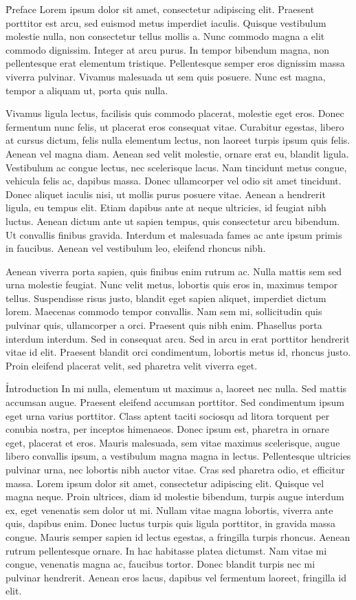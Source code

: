 \documentclass[12pt,onecolumn]{novel}
\begin{document}
\frontpage

\H{Preface}
Lorem ipsum dolor sit amet, consectetur adipiscing elit. Praesent porttitor est arcu, sed euismod metus imperdiet iaculis. Quisque vestibulum molestie nulla, non consectetur tellus mollis a. Nunc commodo magna a elit commodo dignissim. Integer at arcu purus. In tempor bibendum magna, non pellentesque erat elementum tristique. Pellentesque semper eros dignissim massa viverra pulvinar. Vivamus malesuada ut sem quis posuere. Nunc est magna, tempor a aliquam ut, porta quis nulla.

Vivamus ligula lectus, facilisis quis commodo placerat, molestie eget eros. Donec fermentum nunc felis, ut placerat eros consequat vitae. Curabitur egestas, libero at cursus dictum, felis nulla elementum lectus, non laoreet turpis ipsum quis felis. Aenean vel magna diam. Aenean sed velit molestie, ornare erat eu, blandit ligula. Vestibulum ac congue lectus, nec scelerisque lacus. Nam tincidunt metus congue, vehicula felis ac, dapibus massa. Donec ullamcorper vel odio sit amet tincidunt. Donec aliquet iaculis nisi, ut mollis purus posuere vitae. Aenean a hendrerit ligula, eu tempus elit. Etiam dapibus ante at neque ultricies, id feugiat nibh luctus. Aenean dictum ante ut sapien tempus, quis consectetur arcu bibendum. Ut convallis finibus gravida. Interdum et malesuada fames ac ante ipsum primis in faucibus. Aenean vel vestibulum leo, eleifend rhoncus nibh.

Aenean viverra porta sapien, quis finibus enim rutrum ac. Nulla mattis sem sed urna molestie feugiat. Nunc velit metus, lobortis quis eros in, maximus tempor tellus. Suspendisse risus justo, blandit eget sapien aliquet, imperdiet dictum lorem. Maecenas commodo tempor convallis. Nam sem mi, sollicitudin quis pulvinar quis, ullamcorper a orci. Praesent quis nibh enim. Phasellus porta interdum interdum. Sed in consequat arcu. Sed in arcu in erat porttitor hendrerit vitae id elit. Praesent blandit orci condimentum, lobortis metus id, rhoncus justo. Proin eleifend placerat velit, sed pharetra velit viverra eget.

\h{Introduction}
In mi nulla, elementum ut maximus a, laoreet nec nulla. Sed mattis accumsan augue. Praesent eleifend accumsan porttitor. Sed condimentum ipsum eget urna varius porttitor. Class aptent taciti sociosqu ad litora torquent per conubia nostra, per inceptos himenaeos. Donec ipsum est, pharetra in ornare eget, placerat et eros. Mauris malesuada, sem vitae maximus scelerisque, augue libero convallis ipsum, a vestibulum magna magna in lectus. Pellentesque ultricies pulvinar urna, nec lobortis nibh auctor vitae. Cras sed pharetra odio, et efficitur massa. Lorem ipsum dolor sit amet, consectetur adipiscing elit. Quisque vel magna neque. Proin ultrices, diam id molestie bibendum, turpis augue interdum ex, eget venenatis sem dolor ut mi. Nullam vitae magna lobortis, viverra ante quis, dapibus enim. Donec luctus turpis quis ligula porttitor, in gravida massa congue. Mauris semper sapien id lectus egestas, a fringilla turpis rhoncus. Aenean rutrum pellentesque ornare. In hac habitasse platea dictumst. Nam vitae mi congue, venenatis magna ac, faucibus tortor. Donec blandit turpis nec mi pulvinar hendrerit. Aenean eros lacus, dapibus vel fermentum laoreet, fringilla id elit.
\end{document}
